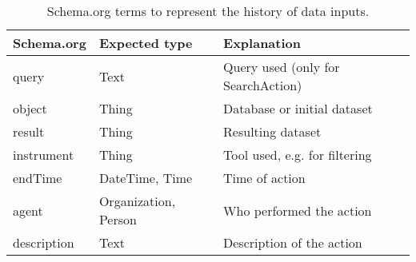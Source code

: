 \begin{table}[bt!]
\caption{Schema.org terms to represent the history of data inputs.}\label{tab:action_schemaorg}
\begin{tabularx}{\linewidth}{l l L}
\toprule
Schema.org & Expected type & Explanation \\
\midrule
query & Text & Query used (only for SearchAction) \\ %
object & Thing & Database or initial dataset \\ %
result & Thing & Resulting dataset \\ %
instrument & Thing & Tool used, e.g. for filtering \\ %
endTime & DateTime, Time & Time of action \\ %
agent & Organization, Person & Who performed the action \\ %
description & Text & Description of the action \\ %
\bottomrule
\end{tabularx}
\end{table}